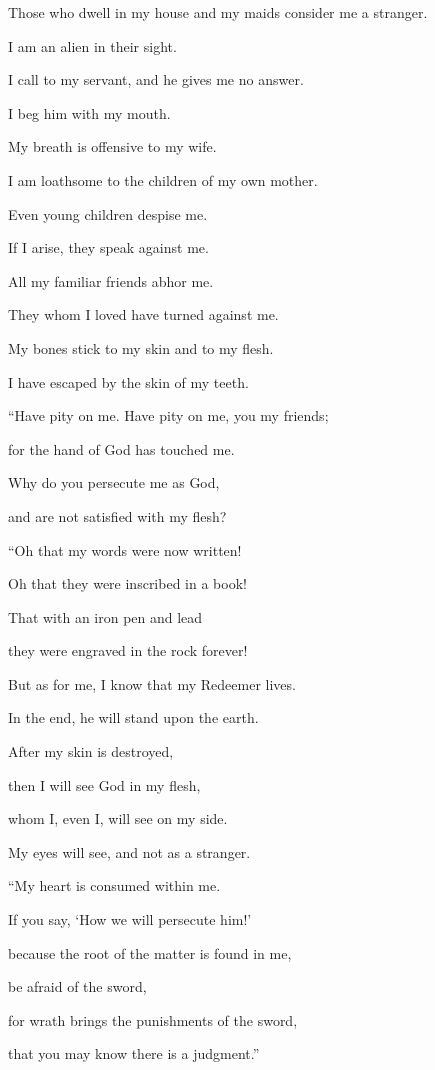 {\par }{\Q {}Those who dwell in my house and my maids consider me a stranger.
\par }{\QB I am an alien in their sight.
\par }{\Q {}I call to my servant, and he gives me no answer.
\par }{\QB I beg him with my mouth.
\par }{\Q {}My breath is offensive to my wife.
\par }{\QB I am loathsome to the children of my own mother.
\par }{\Q {}Even young children despise me.
\par }{\QB If I arise, they speak against me.
\par }{\Q {}All my familiar friends abhor me.
\par }{\QB They whom I loved have turned against me.
\par }{\Q {}My bones stick to my skin and to my flesh.
\par }{\QB I have escaped by the skin of my teeth.
\par }{\BB \par }{\Q {}“Have pity on me. Have pity on me, you my friends;
\par }{\QB for the hand of God has touched me.
\par }{\Q {}Why do you persecute me as God,
\par }{\QB and are not satisfied with my flesh?
\par }{\BB \par }{\Q {}“Oh that my words were now written!
\par }{\QB Oh that they were inscribed in a book!
\par }{\Q {}That with an iron pen and lead
\par }{\QB they were engraved in the rock forever!
\par }{\Q {}But as for me, I know that my Redeemer lives.
\par }{\QB In the end, he will stand upon the earth.
\par }{\Q {}After my skin is destroyed,
\par }{\QB then I will see God in my flesh,
\par }{\Q {}whom I, even I, will see on my side.
\par }{\QB My eyes will see, and not as a stranger.
\par }{\BB \par }{\Q “My heart is consumed within me.
\par }{\Q {}If you say, ‘How we will persecute him!’
\par }{\QB because the root of the matter is found in me,
\par }{\Q {}be afraid of the sword,
\par }{\QB for wrath brings the punishments of the sword,
\par }{\QB that you may know there is a judgment.”

}
